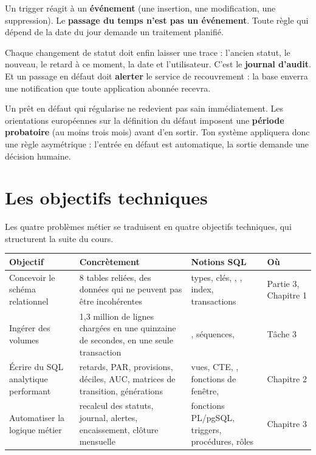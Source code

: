 \begin{regle}
Un trigger réagit à un \textbf{événement} (une insertion, une modification, une suppression). Le
\textbf{passage du temps n'est pas un événement}. Toute règle qui dépend de la date du jour demande un
traitement planifié.
\end{regle}

Chaque changement de statut doit enfin laisser une trace : l'ancien statut, le nouveau, le retard à ce
moment, la date et l'utilisateur. C'est le \textbf{journal d'audit}. Et un passage en défaut doit
\textbf{alerter} le service de recouvrement : la base enverra une notification que toute application
abonnée recevra.

\begin{observation}
Un prêt en défaut qui régularise ne redevient pas sain immédiatement. Les orientations européennes sur
la définition du défaut imposent une \textbf{période probatoire} (au moins trois mois) avant d'en
sortir. Ton système appliquera donc une règle asymétrique : l'entrée en défaut est automatique, la
sortie demande une décision humaine.
\end{observation}

\section{Les objectifs techniques}

Les quatre problèmes métier se traduisent en quatre objectifs techniques, qui structurent la suite du
cours.

\begin{center}\small
\begin{tabularx}{\linewidth}{@{}B{3.3cm} L L P{2.2cm}@{}}
\toprule
Objectif & Concrètement & Notions SQL & Où \\
\midrule
Concevoir le schéma relationnel & 8 tables reliées, des données qui ne peuvent pas être incohérentes &
types, clés, , , index, transactions & Partie 3, Chapitre 1 \\
Ingérer des volumes & 1,3 million de lignes chargées en une quinzaine de secondes, en une seule
transaction & , séquences,  & Tâche 3 \\
Écrire du SQL analytique performant & retards, PAR, provisions, déciles, AUC, matrices de transition,
générations & vues, CTE, , fonctions de fenêtre,  & Chapitre 2 \\
Automatiser la logique métier & recalcul des statuts, journal, alertes, encaissement, clôture mensuelle &
fonctions PL/pgSQL, triggers, procédures, rôles & Chapitre 3 \\
\bottomrule
\end{tabularx}
\end{center}

